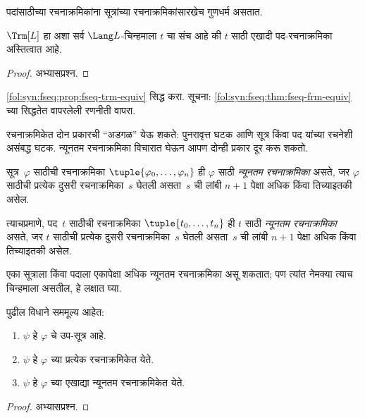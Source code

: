 पदांसाठीच्या रचनाक्रमिकांना सूत्रांच्या रचनाक्रमिकांसारखेच गुणधर्म
असतात.

\begin{prop}
\label{fol:syn:fseq:prop:fseq-trm-equiv}
$\Trm[L]$ हा अशा सर्व $\Lang L$-चिन्हमाला $t$ चा संच आहे की $t$
साठी एखादी पद-रचनाक्रमिका अस्तित्वात आहे.
\end{prop}

\begin{proof}
अभ्यासप्रश्न.
\end{proof}

\begin{prob}
\ref{fol:syn:fseq:prop:fseq-trm-equiv} सिद्ध करा.
सूचना: \ref{fol:syn:fseq:thm:fseq-frm-equiv} च्या सिद्धतेत वापरलेली
रणनीती वापरा.
\end{prob}

रचनाक्रमिकेत दोन प्रकारची ``अडगळ'' येऊ शकते: पुनरावृत्त घटक आणि सूत्र
किंवा पद यांच्या रचनेशी असंबद्ध घटक. न्यूनतम रचनाक्रमिका विचारात घेऊन
आपण दोन्ही प्रकार दूर करू शकतो.

\begin{defn}
\label{fol:syn:fseq:defn:minimal-fseq}
सूत्र~$\varphi$ साठीची रचनाक्रमिका $\tuple{\varphi_0, \ldots, \varphi_n}$ ही
$\varphi$ साठी \emph{न्यूनतम रचनाक्रमिका} असते, जर $\varphi$ साठीची प्रत्येक
दुसरी रचनाक्रमिका~$s$ घेतली असता~$s$ ची लांबी $n+1$ पेक्षा अधिक किंवा
तिच्याइतकी असेल.

त्याचप्रमाणे, पद~$t$ साठीची रचनाक्रमिका $\tuple{t_0, \ldots, t_n}$ ही
$t$ साठी \emph{न्यूनतम रचनाक्रमिका} असते, जर $t$ साठीची प्रत्येक
दुसरी रचनाक्रमिका~$s$ घेतली असता~$s$ ची लांबी $n+1$ पेक्षा अधिक किंवा
तिच्याइतकी असेल.
\end{defn}

एका सूत्राला किंवा पदाला एकापेक्षा अधिक न्यूनतम रचनाक्रमिका असू शकतात;
पण त्यांत नेमक्या त्याच चिन्हमाला असतील, हे लक्षात घ्या.

\begin{prop}
\label{fol:syn:fseq:prop:subformula-equivs}
पुढील विधाने सममूल्य आहेत:
\begin{enumerate}
    \item $\psi$ हे $\varphi$ चे उप-सूत्र आहे.
    \item $\psi$ हे $\varphi$ च्या प्रत्येक रचनाक्रमिकेत येते.
    \item $\psi$ हे $\varphi$ च्या एखाद्या न्यूनतम रचनाक्रमिकेत येते.
\end{enumerate}
\end{prop}

\begin{proof}
अभ्यासप्रश्न.
\end{proof}

